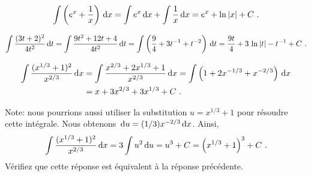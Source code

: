 {
\[
\int \left( e^x + \frac{1}{x}\right) \dx{x}
= \int e^x \dx{x} + \int \frac{1}{x} \dx{x} = e^x + \ln|x| + C \ .
\]

\[
\int \frac{(3t+2)^2}{4t^2}\,\mathrm{d}t = \int \frac{9t^2+12t+4}{4t^2}\,\mathrm{d}t =
\int \left( \frac{9}{4} + 3 t^{-1} + t^{-2} \right) \,\mathrm{d}t =
\frac{9t}{4} + 3\,\ln|t| - t^{-1} + C \ .
\]

\begin{align*}
\int \frac{(x^{1/3} + 1)^2}{x^{2/3}} \,\mathrm{d}x
&= \int \frac{x^{2/3} + 2 x^{1/3} + 1}{x^{2/3}} \,\mathrm{d}x
= \int \left( 1 + 2 x^{-1/3} + x^{-2/3}\right) \,\mathrm{d}x \\
&= x + 3 x^{2/3} + 3 x^{1/3} + C \ .
\end{align*}

\noindent Note: nous pourrions aussi utiliser la substitution $u = x^{1/3} + 1$
pour résoudre cette intégrale.  Nous obtenons
$\,\mathrm{d}u = (1/3) x^{-2/3} \,\mathrm{d}x$.  Ainsi,
\[
\int \frac{(x^{1/3} + 1)^2}{x^{2/3}} \,\mathrm{d}x
= 3 \int u^2 \,\mathrm{d}u
= u^3 + C
= \left(x^{1/3} + 1\right)^3 + C \ .
\]
Vérifiez que cette réponse est équivalent à la réponse précédente.
}

